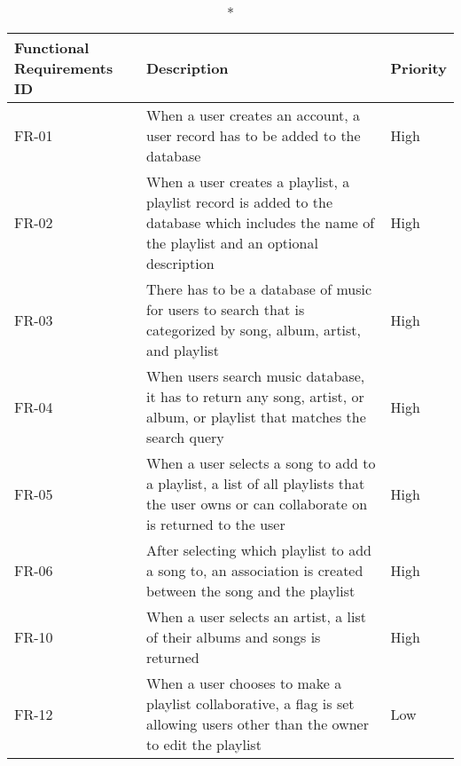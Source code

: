 \begin{longtable}{lXl}
			\caption*{Functional Requirements}
			\endfirsthead
			\endhead
			ID & Description & Priority \\\hline
			FR-01 & When a user creates an account, a user record has to be added to the database & High \\
			FR-02 & When a user creates a playlist, a playlist record is added to the database which includes the name of the playlist and an optional description & High \\
			FR-03 & There has to be a database of music for users to search that is categorized by song, album, artist, and playlist & High \\
			FR-04 & When users search music database, it has to return any song, artist, or album, or playlist that matches the search query & High \\
			FR-05 & When a user selects a song to add to a playlist, a list of all playlists that the user owns or can collaborate on is returned to the user & High \\
			FR-06 & After selecting which playlist to add a song to, an association is created between the song and the playlist & High \\
			FR-10 & When a user selects an artist, a list of their albums and songs is returned & High \\
			FR-12 & When a user chooses to make a playlist collaborative, a flag is set allowing users other than the owner to edit the playlist & Low \\
\end{longtable}